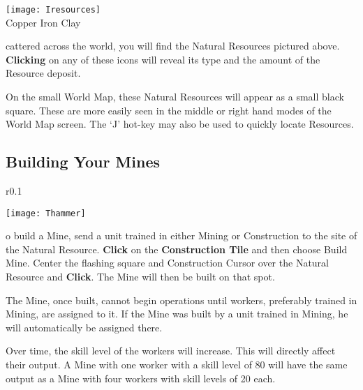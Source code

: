 

\begin{center}
\texttt{[image: Iresources]} %
\\ Copper Iron Clay
\end{center}

cattered across the world, you will find the Natural Resources pictured above. \textbf{Clicking} on any of these icons will reveal its type and the amount of the Resource deposit.


On the small World Map, these Natural Resources will appear as a small black square. These are more easily seen in the middle or right hand modes of the World Map screen. The ‘J’ hot-key may also be used to quickly locate Resources.

\subsection{\textsf{Building Your Mines}}


\begin{wrapfigure}{r}{0.1\textwidth}
    \vspace{-20pt}
    \begin{center}
        \texttt{[image: Thammer]}
    \end{center}
    \vspace{-20pt}
\end{wrapfigure}


o build a Mine, send a unit trained in either Mining or Construction to the site of the Natural Resource. \textbf{Click} on the \textbf{Construction Tile} and then choose Build Mine. Center the flashing square and Construction Cursor over the Natural Resource and \textbf{Click}. The Mine will then be built on that spot.

The Mine, once built, cannot begin operations until workers, preferably trained in Mining, are assigned to it. If the Mine was built by a unit trained in Mining, he will automatically be assigned there.

Over time, the skill level of the workers will increase. This will directly affect their output. A Mine with one worker with a skill level of 80 will have the same output as a Mine with four workers with skill levels of 20 each.

